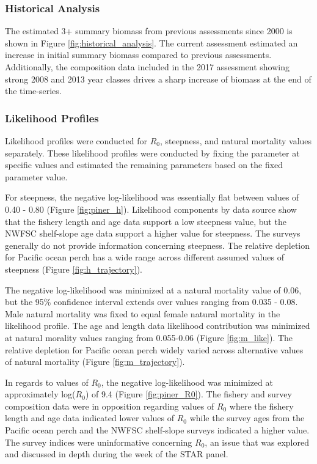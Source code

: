 \documentclass[12pt,]{article}
\begin{document}
\subsubsection{Historical Analysis}\label{historical-analysis}

The estimated 3+ summary biomass from previous assessments since 2000 is
shown in Figure \ref{fig:historical_analysis}. The current assessment
estimated an increase in initial summary biomass compared to previous
assessments. Additionally, the composition data included in the 2017
assessment showing strong 2008 and 2013 year classes drives a sharp
increase of biomass at the end of the time-series.

\subsubsection{Likelihood Profiles}\label{likelihood-profiles}

Likelihood profiles were conducted for \(R_0\), steepness, and natural
mortality values separately. These likelihood profiles were conducted by
fixing the parameter at specific values and estimated the remaining
parameters based on the fixed parameter value.

For steepness, the negative log-likelihood was essentially flat between
values of 0.40 - 0.80 (Figure \ref{fig:piner_h}). Likelihood components
by data source show that the fishery length and age data support a low
steepness value, but the NWFSC shelf-slope age data support a higher
value for steepness. The surveys generally do not provide information
concerning steepness. The relative depletion for Pacific ocean perch has
a wide range across different assumed values of steepness (Figure
\ref{fig:h_trajectory}).

The negative log-likelihood was minimized at a natural mortality value
of 0.06, but the 95\% confidence interval extends over values ranging
from 0.035 - 0.08. Male natural mortality was fixed to equal female
natural mortality in the likelihood profile. The age and length data
likelihood contribution was minimized at natural morality values ranging
from 0.055-0.06 (Figure \ref{fig:m_like}). The relative depletion for
Pacific ocean perch widely varied across alternative values of natural
mortality (Figure \ref{fig:m_trajectory}).

In regards to values of \(R_0\), the negative log-likelihood was
minimized at approximately log(\(R_0\)) of 9.4 (Figure
\ref{fig:piner_R0}). The fishery and survey composition data were in
opposition regarding values of \(R_0\) where the fishery length and age
data indicated lower values of \(R_0\) while the survey ages from the
Pacific ocean perch and the NWFSC shelf-slope surveys indicated a higher
value. The survey indices were uninformative concerning \(R_0\), an
issue that was explored and discussed in depth during the week of the
STAR panel.
\end{document}
